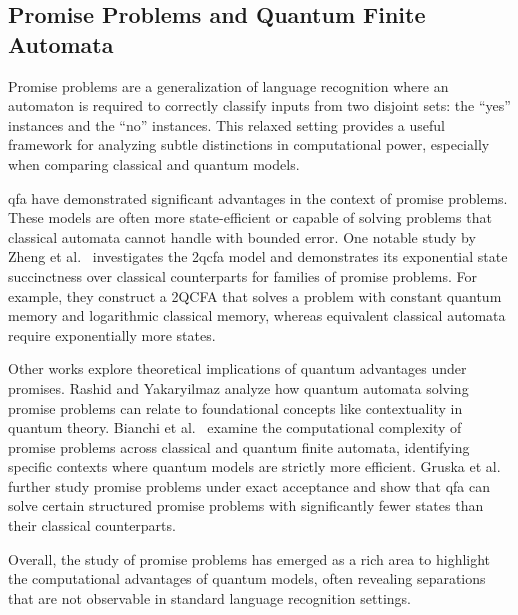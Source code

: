 \subsection{Promise Problems and Quantum Finite Automata}

Promise problems are a generalization of language recognition where an automaton is required to correctly classify inputs from two disjoint sets: the “yes” instances and the “no” instances. This relaxed setting provides a useful framework for analyzing subtle distinctions in computational power, especially when comparing classical and quantum models.

\gls{qfa} have demonstrated significant advantages in the context of promise problems. These models are often more state-efficient or capable of solving problems that classical automata cannot handle with bounded error. One notable study by Zheng et al.\ \cite{zheng2013state} investigates the \gls{2qcfa} model and demonstrates its exponential state succinctness over classical counterparts for families of promise problems. For example, they construct a 2QCFA that solves a problem with constant quantum memory and logarithmic classical memory, whereas equivalent classical automata require exponentially more states.

Other works explore theoretical implications of quantum advantages under promises. Rashid and Yakaryilmaz \cite{rashid2014implications} analyze how quantum automata solving promise problems can relate to foundational concepts like contextuality in quantum theory. Bianchi et al.\ \cite{bianchi2014complexity} examine the computational complexity of promise problems across classical and quantum finite automata, identifying specific contexts where quantum models are strictly more efficient. Gruska et al.\ \cite{gruska2015potential} further study promise problems under exact acceptance and show that \gls{qfa} can solve certain structured promise problems with significantly fewer states than their classical counterparts.

Overall, the study of promise problems has emerged as a rich area to highlight the computational advantages of quantum models, often revealing separations that are not observable in standard language recognition settings.
